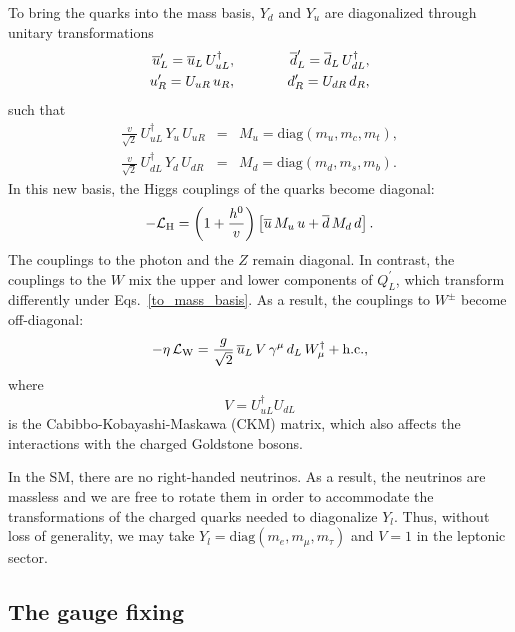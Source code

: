 \documentclass{ws-ijmpa}
\begin{document}
To bring the quarks into the mass basis,
$Y_d$ and $Y_u$ are diagonalized through unitary transformations
%
\begin{eqnarray}
\overline{u}^\prime_L
= 
\overline{u}_L\, U^\dagger_{uL},
& \hspace{10mm} &
\overline{d}^\prime_L
=
\overline{d}_L\, U^\dagger_{dL},
\nonumber\\
u^\prime_R
=
U_{uR}\, u_R,
& \hspace{10mm} &
d^\prime_R
=
U_{dR}\, d_R,
\label{to_mass_basis}
\end{eqnarray}
%
such that
%
\begin{eqnarray}
\frac{v}{\sqrt{2}}\, U^\dagger_{uL}\, Y_u\, U_{uR}
&=&
M_u =
\textrm{diag} \left( m_u, m_c, m_t \right),
\nonumber\\
\frac{v}{\sqrt{2}}\, U^\dagger_{dL}\, Y_d\, U_{dR}
&=&
M_d =
\textrm{diag} \left( m_d, m_s, m_b \right).
\end{eqnarray}
%
In this new basis,
the Higgs couplings of the quarks become diagonal:
%
\begin{equation}
- \mathcal{L}_{\rm H}
=
\left(1 + \frac{h^0}{v} \right)
\left[
\overline{u}\,  M_u\, u
+
\overline{d}\,  M_d\, d
\right].
\end{equation}
%
The couplings to the photon and the $Z$ remain diagonal.
In contrast,
the couplings to the $W$ mix the upper and lower components
of $Q^\prime_L$,
which transform differently under Eqs.~\eqref{to_mass_basis}.
As a result,
the couplings to $W^\pm$ become off-diagonal:
%
\begin{equation}
- \eta\, \mathcal{L}_{\rm W}
=
\frac{g}{\sqrt{2}}\,
\overline{u}_L\, V\, \gamma^\mu\, d_L\, W_\mu^\dagger 
+
\textrm{h.c.} ,
\end{equation}
%
where
%
\begin{equation}
V = U^\dagger_{uL} U_{dL}
\end{equation}
%
is the Cabibbo-Kobayashi-Maskawa (CKM) matrix,
which also affects the interactions with the charged
Goldstone bosons.

In the SM,
there are no right-handed neutrinos.
As a result,
the neutrinos are massless and we are free to
rotate them in order to accommodate the
transformations of the charged quarks needed
to diagonalize $Y_l$.
Thus,
without loss of generality,
we may take $Y_l = \textrm{diag} \left( m_e, m_\mu, m_\tau \right)$
and $V=1$ in the leptonic sector.





\subsection{\label{subsec:GFix}The gauge fixing}
\end{document}
